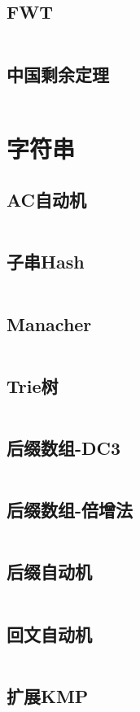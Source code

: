 \documentclass[UTF8]{ctexart}
\begin{document}
\subsection{FWT}
\inputminted{cpp}{math/FWT.cpp}
\subsection{中国剩余定理}
\inputminted{cpp}{math/中国剩余定理.cpp}
\section{字符串}
\subsection{AC自动机}
\inputminted{cpp}{string/AC自动机.cpp}
\subsection{子串Hash}
\inputminted{cpp}{string/Hash.cpp}
\subsection{Manacher}
\inputminted{cpp}{string/Manacher回文串.cpp}
\subsection{Trie树}
\inputminted{cpp}{string/Trie树.cpp}
\subsection{后缀数组-DC3}
\inputminted{cpp}{string/后缀数组-DC3.cpp}
\subsection{后缀数组-倍增法}
\inputminted{cpp}{string/后缀数组-倍增法.cpp}
\subsection{后缀自动机}
\inputminted{cpp}{string/后缀自动机.cpp}
\subsection{回文自动机}
\inputminted{cpp}{string/回文自动机.cpp}
\subsection{扩展KMP}
\inputminted{cpp}{string/扩展KMP.cpp}
\end{document}
